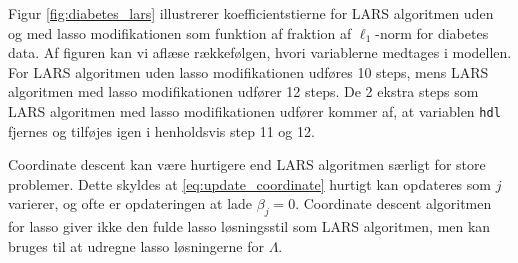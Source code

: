 Figur \ref{fig:diabetes_lars} illustrerer koefficientstierne for LARS algoritmen uden og med lasso modifikationen som funktion af fraktion af \(\ell_1\)-norm for diabetes data.
Af figuren kan vi aflæse rækkefølgen, hvori variablerne medtages i modellen.
For LARS algoritmen uden lasso modifikationen udføres 10 steps, mens LARS algoritmen med lasso modifikationen udfører 12 steps.
De 2 ekstra steps som LARS algoritmen med lasso modifikationen udfører kommer af, at variablen \texttt{hdl} fjernes og tilføjes igen i henholdsvis step 11 og 12.

%

%
%
%
%
%



Coordinate descent kan være hurtigere end LARS algoritmen særligt for store problemer.
Dette skyldes at \eqref{eq:update_coordinate} hurtigt kan opdateres som \(j\) varierer, og ofte er opdateringen at lade \(\beta_j = 0\).
Coordinate descent algoritmen for lasso giver ikke den fulde lasso løsningsstil som LARS algoritmen, men kan bruges til at udregne lasso løsningerne for \(\Lambda\).
